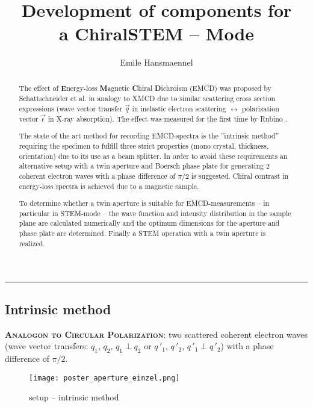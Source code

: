 \documentclass[portrait]{sciposter}
\author{Emile Hansmaennel}
\title{Development of components for\\ a ChiralSTEM -- Mode}
\institute{Universität Regensburg\\}
\begin{document}
\maketitle
\rule{\textwidth}{2mm}

\begin{multicols}{3}

\begin{abstract}
The effect of \textbf{E}nergy-loss \textbf{M}agnetic \textbf{C}hiral \textbf{D}ichroism (EMCD) was proposed by Schattschneider et al. \cite{emcd_proposal} in analogy to XMCD due to similar scattering cross section expressions (wave vector transfer $\vec{q}$ in inelastic electron scattering $\leftrightarrow$ polarization vector $\vec{\epsilon}$ in X-ray absorption). The effect was measured for the first time by Rubino \cite{emcd_nature}.

The state of the art method for recording EMCD-spectra is the ''intrinsic method'' requiring the specimen to fulfill three strict properties (mono crystal, thickness, orientation) due to its use as a beam splitter. In order to avoid these requirements an alternative setup with a twin aperture and Boersch phase plate for generating 2 coherent electron waves with a phase difference of $\pi/2$ is suggested. Chiral contrast in energy-loss spectra is achieved due to a magnetic sample.

To determine whether a twin aperture is suitable for EMCD-measurements -- in particular in STEM-mode -- the wave function and intensity distribution in the sample plane are calculated numerically and the optimum dimensions for the aperture and phase plate are determined. Finally a STEM operation with a twin aperture is realized.
\end{abstract}

\section{Intrinsic method}
\textbf{\scshape Analogon to Circular Polarization}: two scattered coherent electron waves (wave vector transfers: $q_1$, $q_2$, $q_1\perp q_2$ or $q\,'_1$, $q\,'_2$, $q\,'_1\perp q\,'_2$) with a phase difference of $\pi/2$.

\begin{figure}[h]
\begin{center}
\label{fig_intrinsic}
\texttt{[image: poster\_aperture\_einzel.png]}
\caption{setup -- intrinsic method}
\end{center}
\end{figure}


\end{multicols}
\end{document}
